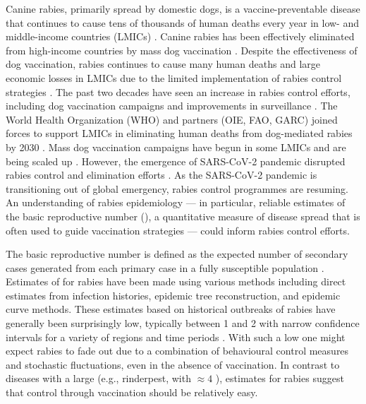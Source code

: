 Canine rabies, primarily spread by domestic dogs, is a vaccine-preventable disease that continues to cause tens of thousands of human deaths every year in low- and middle-income countries (LMICs)
\citep{taylor2017difficulties, minghui2018new}.
Canine rabies has been effectively eliminated from high-income countries by mass dog vaccination \citep{rupprecht2008can}.
Despite the effectiveness of dog vaccination, rabies continues to cause many human deaths and large economic losses in LMICs due to the limited implementation of rabies control strategies \citep{hampson2015estimating}. 
The past two decades have seen an increase in rabies control efforts, including dog vaccination campaigns and improvements in surveillance \citep{kwoba2019dog, mtema2016mobile, gibson2018one, mazeri2018barriers, wallace2015establishment}.
The World Health Organization (WHO) and partners (OIE, FAO, GARC) joined forces to support LMICs in eliminating human deaths from dog-mediated rabies by 2030 \citep{minghui2018new, abela20162016}. Mass dog vaccination campaigns have begun in some LMICs and are being scaled up \citep{castillo2019socio, evans2019implementation}.
However, the emergence of SARS-CoV-2 pandemic disrupted rabies control and elimination efforts \citep{nadal2022impact}.
As the SARS-CoV-2 pandemic is transitioning out of global emergency, rabies control programmes are resuming.
An understanding of rabies epidemiology --- in particular, reliable estimates of the basic reproductive number (\rzero), a quantitative measure of disease spread that is often used to guide vaccination strategies --- could inform rabies control efforts.

The basic reproductive number \rzero is defined as the expected number of secondary cases generated from each primary case in a fully susceptible population \citep{macdonald1952analysis}.
Estimates of \rzero for rabies have been made using various methods including direct estimates from infection histories, epidemic tree reconstruction, and epidemic curve methods. These \rzero estimates based on historical outbreaks of rabies have generally been surprisingly low, typically between 1 and 2 with narrow confidence intervals for a variety of regions and time periods \citep{hampson2009transmission, kurosawa2017rise, kitala2002comparison}. 
With such a low \rzero one might expect rabies to fade out due to a combination of behavioural control measures and stochastic fluctuations, even in the absence of vaccination.
In contrast to diseases with a large \rzero (e.g., rinderpest, with \rzero $\approx 4$ \citep{mariner2005model}), \rzero estimates for rabies suggest that control through vaccination should be relatively easy.

